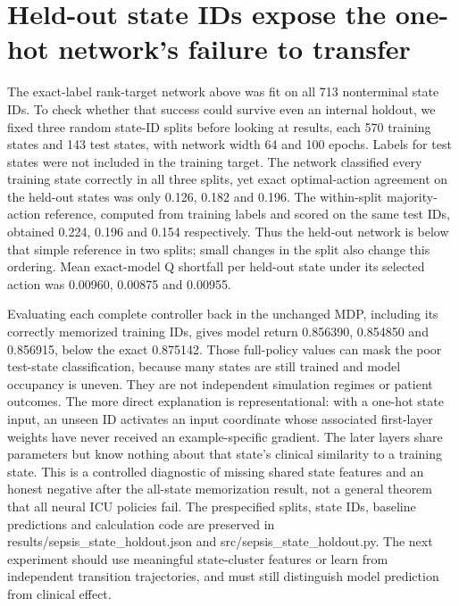 \section{Held-out state IDs expose the one-hot network's failure to transfer}
The exact-label rank-target network above was fit on all 713 nonterminal state IDs. To check whether that success could survive even an internal holdout, we fixed three random state-ID splits before looking at results, each 570 training states and 143 test states, with network width 64 and 100 epochs. Labels for test states were not included in the training target. The network classified every training state correctly in all three splits, yet exact optimal-action agreement on the held-out states was only 0.126, 0.182 and 0.196. The within-split majority-action reference, computed from training labels and scored on the same test IDs, obtained 0.224, 0.196 and 0.154 respectively. Thus the held-out network is below that simple reference in two splits; small changes in the split also change this ordering. Mean exact-model Q shortfall per held-out state under its selected action was 0.00960, 0.00875 and 0.00955.

Evaluating each complete controller back in the unchanged MDP, including its correctly memorized training IDs, gives model return 0.856390, 0.854850 and 0.856915, below the exact 0.875142. Those full-policy values can mask the poor test-state classification, because many states are still trained and model occupancy is uneven. They are not independent simulation regimes or patient outcomes. The more direct explanation is representational: with a one-hot state input, an unseen ID activates an input coordinate whose associated first-layer weights have never received an example-specific gradient. The later layers share parameters but know nothing about that state's clinical similarity to a training state. This is a controlled diagnostic of missing shared state features and an honest negative after the all-state memorization result, not a general theorem that all neural ICU policies fail. The prespecified splits, state IDs, baseline predictions and calculation code are preserved in results/sepsis\_state\_holdout.json and src/sepsis\_state\_holdout.py. The next experiment should use meaningful state-cluster features or learn from independent transition trajectories, and must still distinguish model prediction from clinical effect.

